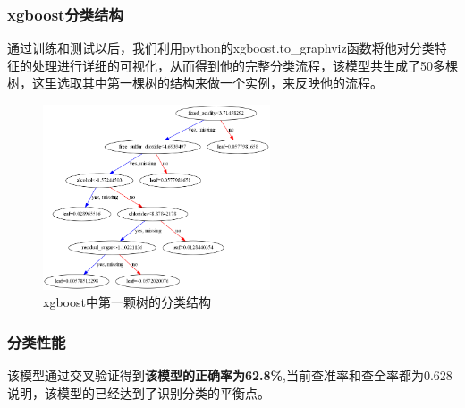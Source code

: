 \documentclass{whutmod}
\begin{document}
\subsubsection{xgboost分类结构}
通过训练和测试以后，我们利用python的xgboost.to\_graphviz函数将他对分类特征的处理进行详细的可视化，从而得到他的完整分类流程，该模型共生成了50多棵树，这里选取其中第一棵树的结构来做一个实例，来反映他的流程。
\begin{figure}[!h]
	\centering
	\includegraphics[width=0.6\textwidth]{xgbtree.png}
	\caption{xgboost中第一颗树的分类结构}
\end{figure}


\subsubsection{分类性能}
该模型通过交叉验证得到\textbf{该模型的正确率为}\textbf{62.8\%},当前查准率和查全率都为0.628说明，该模型的已经达到了识别分类的平衡点。
\end{document}
